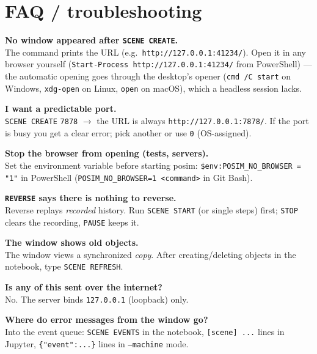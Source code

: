 \documentclass[11pt]{article}
\newcommand{\kw}[1]{\texttt{\uppercase{#1}}}
\newcommand{\code}[1]{\texttt{#1}}
\begin{document}
\section{FAQ / troubleshooting}

\textbf{No window appeared after \kw{scene create}.}\\
The command prints the URL (e.g.\ \code{http://127.0.0.1:41234/}).
Open it in any browser yourself (\code{Start-Process
http://127.0.0.1:41234/} from PowerShell) --- the automatic opening
goes through the desktop's opener (\code{cmd /C start} on Windows,
\code{xdg-open} on Linux, \code{open} on macOS), which a headless
session lacks.

\textbf{I want a predictable port.}\\
\kw{scene create} \code{7878} $\to$ the URL is always
\code{http://127.0.0.1:7878/}. If the port is busy you get a clear
error; pick another or use \code{0} (OS-assigned).

\textbf{Stop the browser from opening (tests, servers).}\\
Set the environment variable before starting posim:
\verb|$env:POSIM_NO_BROWSER = "1"| in PowerShell
(\verb|POSIM_NO_BROWSER=1 <command>| in Git Bash).

\textbf{\kw{reverse} says there is nothing to reverse.}\\
Reverse replays \emph{recorded} history. Run \kw{scene start} (or
single steps) first; \kw{stop} clears the recording, \kw{pause}
keeps it.

\textbf{The window shows old objects.}\\
The window views a synchronized \emph{copy}. After creating/deleting
objects in the notebook, type \kw{scene refresh}.

\textbf{Is any of this sent over the internet?}\\
No. The server binds \code{127.0.0.1} (loopback) only.

\textbf{Where do error messages from the window go?}\\
Into the event queue: \kw{scene events} in the notebook,
\code{[scene] ...} lines in Jupyter, \code{\{"event":...\}} lines in
\code{--machine} mode.
\end{document}
